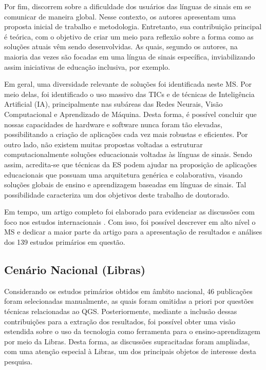 Por fim,  discorrem sobre a dificuldade dos usuários das línguas de sinais em se comunicar de maneira global. Nesse contexto, os autores apresentam uma proposta inicial de trabalho e metodologia. Entretanto, sua contribuição principal é teórica, com o objetivo de criar um meio para reflexão sobre a forma como as soluções atuais vêm sendo desenvolvidas. As quais, segundo os autores, na maioria das vezes são focadas em uma língua de sinais específica, inviabilizando assim iniciativas de educação inclusiva, por exemplo.

Em geral, uma diversidade relevante de soluções foi identificada neste MS. Por meio delas, foi identificado o uso massivo das TICs e de técnicas de Inteligência Artificial (IA), principalmente nas subáreas das Redes Neurais, Visão Computacional e Aprendizado de Máquina. Desta forma, é possível concluir que nossas capacidades de hardware e software nunca foram tão elevadas, possibilitando a criação de aplicações cada vez mais robustas e eficientes. Por outro lado, não existem muitas propostas voltadas a estruturar computacionalmente soluções educacionais voltadas às línguas de sinais. Sendo assim, acredita-se que técnicas da ES podem ajudar na proposição de aplicações educacionais que possuam uma arquitetura genérica e colaborativa, visando soluções globais de ensino e aprendizagem baseadas em línguas de sinais. Tal possibilidade caracteriza um dos objetivos deste trabalho de doutorado.



Em tempo, um artigo completo foi elaborado para evidenciar as discussões com foco nos estudos internacionais \cite{FalvoJr2020_FIE}. Com isso, foi possível descrever em alto nível o MS e dedicar a maior parte da artigo para a apresentação de resultados e análises dos 139 estudos primários em questão.

\subsection{Cenário Nacional (Libras)}
\label{ms:cenario-nacional}

Considerando os estudos primários obtidos em âmbito nacional, 46 publicações foram selecionadas manualmente, as quais foram omitidas a priori por questões técnicas relacionadas ao QGS. Posteriormente, mediante a inclusão dessas contribuições para a extração dos resultados, foi possível obter uma visão estendida sobre o uso da tecnologia como ferramenta para o ensino-aprendizagem por meio da Libras. Desta forma, as discussões supracitadas foram ampliadas, com uma atenção especial à Libras, um dos principais objetos de interesse desta pesquisa.

